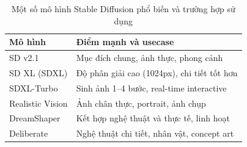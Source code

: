 \begin{table}[h]
\centering
\caption{Một số mô hình Stable Diffusion phổ biến và trường hợp sử dụng}
\label{tab:sd_models}
\begin{tabular}{lp{7cm}}
\hline
\textbf{Mô hình} & \textbf{Điểm mạnh và usecase} \\
\hline
SD v2.1            & Mục đích chung, ảnh thực, phong cảnh \\
SD XL (SDXL)       & Độ phân giải cao (1024px), chi tiết tốt hơn \\
SDXL-Turbo         & Sinh ảnh 1--4 bước, real-time interactive \\
Realistic Vision   & Ảnh chân thực, portrait, ảnh chụp \\
DreamShaper        & Kết hợp nghệ thuật và thực tế, linh hoạt \\
Deliberate         & Nghệ thuật chi tiết, nhân vật, concept art \\
\hline
\end{tabular}
\end{table}
